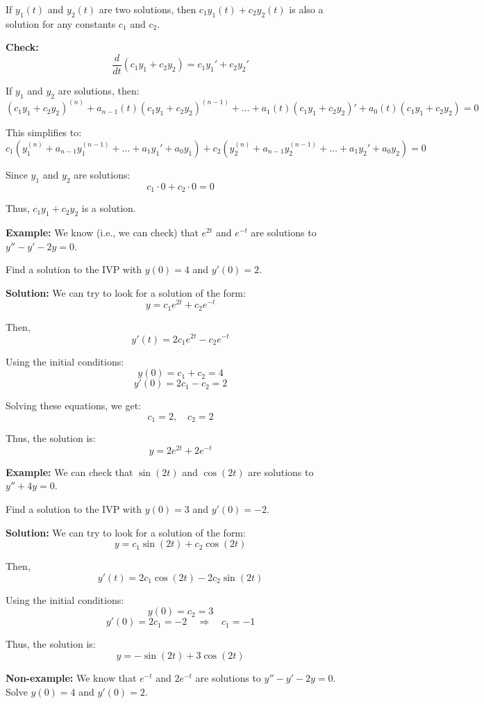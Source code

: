 \documentclass{article}
\begin{document}
If \( y_1(t) \) and \( y_2(t) \) are two solutions, then \( c_1 y_1(t) + c_2 y_2(t) \) is also a solution for any constants \( c_1 \) and \( c_2 \).

\textbf{Check:}
\[
\frac{d}{dt}(c_1 y_1 + c_2 y_2) = c_1 y_1' + c_2 y_2'
\]

If \( y_1 \) and \( y_2 \) are solutions, then:
\[
(c_1 y_1 + c_2 y_2)^{(n)} + a_{n-1}(t)(c_1 y_1 + c_2 y_2)^{(n-1)} + \dots + a_1(t)(c_1 y_1 + c_2 y_2)' + a_0(t)(c_1 y_1 + c_2 y_2) = 0
\]

This simplifies to:
\[
c_1 (y_1^{(n)} + a_{n-1} y_1^{(n-1)} + \dots + a_1 y_1' + a_0 y_1) + c_2 (y_2^{(n)} + a_{n-1} y_2^{(n-1)} + \dots + a_1 y_2' + a_0 y_2) = 0
\]

Since \( y_1 \) and \( y_2 \) are solutions:
\[
c_1 \cdot 0 + c_2 \cdot 0 = 0
\]

Thus, \( c_1 y_1 + c_2 y_2 \) is a solution.

\textbf{Example:} We know (i.e., we can check) that \( e^{2t} \) and \( e^{-t} \) are solutions to \( y'' - y' - 2y = 0 \).

Find a solution to the IVP with \( y(0) = 4 \) and \( y'(0) = 2 \).

\textbf{Solution:} We can try to look for a solution of the form:
\[
y = c_1 e^{2t} + c_2 e^{-t}
\]

Then,
\[
y'(t) = 2c_1 e^{2t} - c_2 e^{-t}
\]

Using the initial conditions:
\[
y(0) = c_1 + c_2 = 4
\]
\[
y'(0) = 2c_1 - c_2 = 2
\]

Solving these equations, we get:
\[
c_1 = 2, \quad c_2 = 2
\]

Thus, the solution is:
\[
y = 2e^{2t} + 2e^{-t}
\]

\textbf{Example:} We can check that \( \sin(2t) \) and \( \cos(2t) \) are solutions to \( y'' + 4y = 0 \).

Find a solution to the IVP with \( y(0) = 3 \) and \( y'(0) = -2 \).

\textbf{Solution:} We can try to look for a solution of the form:
\[
y = c_1 \sin(2t) + c_2 \cos(2t)
\]

Then,
\[
y'(t) = 2c_1 \cos(2t) - 2c_2 \sin(2t)
\]

Using the initial conditions:
\[
y(0) = c_2 = 3
\]
\[
y'(0) = 2c_1 = -2 \quad \Rightarrow \quad c_1 = -1
\]

Thus, the solution is:
\[
y = -\sin(2t) + 3\cos(2t)
\]

\textbf{Non-example:} We know that \( e^{-t} \) and \( 2e^{-t} \) are solutions to \( y'' - y' - 2y = 0 \). Solve \( y(0) = 4 \) and \( y'(0) = 2 \).
\end{document}
